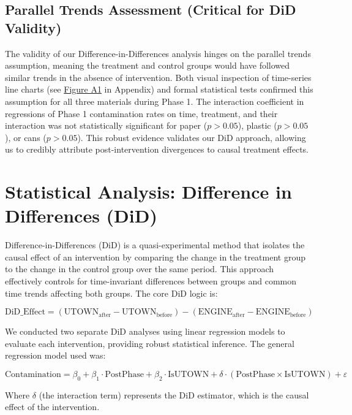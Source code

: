 \documentclass[12pt]{article}
\begin{document}
\subsection{Parallel Trends Assessment (Critical for DiD Validity)}

The validity of our Difference-in-Differences analysis hinges on the parallel trends assumption, meaning the treatment and control groups would have followed similar trends in the absence of intervention. Both visual inspection of time-series line charts (see \hyperref[fig:parallel_trends]{Figure A1} in Appendix) and formal statistical tests confirmed this assumption for all three materials during Phase 1. The interaction coefficient in regressions of Phase 1 contamination rates on time, treatment, and their interaction was not statistically significant for paper ($p > 0.05$), plastic ($p > 0.05$), or cans ($p > 0.05$). This robust evidence validates our DiD approach, allowing us to credibly attribute post-intervention divergences to causal treatment effects.

\section{Statistical Analysis: Difference in Differences (DiD)}

Difference-in-Differences (DiD) is a quasi-experimental method that isolates the causal effect of an intervention by comparing the change in the treatment group to the change in the control group over the same period. This approach effectively controls for time-invariant differences between groups and common time trends affecting both groups. The core DiD logic is:

\begin{equation}
\text{DiD\_Effect} = (\text{UTOWN}_{\text{after}} - \text{UTOWN}_{\text{before}}) - (\text{ENGINE}_{\text{after}} - \text{ENGINE}_{\text{before}})
\end{equation}

We conducted two separate DiD analyses using linear regression models to evaluate each intervention, providing robust statistical inference. The general regression model used was:

\begin{equation}
\text{Contamination} = \beta_0 + \beta_1 \cdot \text{PostPhase} + \beta_2 \cdot \text{IsUTOWN} + \delta \cdot (\text{PostPhase} \times \text{IsUTOWN}) + \varepsilon
\end{equation}

Where $\delta$ (the interaction term) represents the DiD estimator, which is the causal effect of the intervention.
\end{document}
